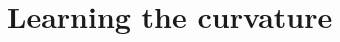 \documentclass[aip,preprint,amsmath,amssymb,floatfix]{revtex4-2}
\begin{document}




\section{Learning the curvature}\label{sec:memory}
\end{document}
